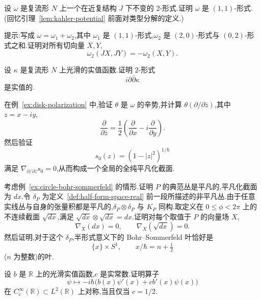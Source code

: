 {\begin{exercise}[辛形式的类型分解]\label{ex:symplectic-form-type-one-one}
设 $\omega$ 是复流形 $N$ 上一个在近复结构 $J$ 下不变的 2-形式.证明 $\omega$ 是 $(1,1)$-形式.(回忆引理~\ref{lem:kahler-potential} 前面对类型分解的定义.)

提示:写成 $\omega=\omega_1+\omega_2$,其中 $\omega_1$ 是 $(1,1)$-形式,$\omega_2$ 是 $(2,0)$-形式与 $(0,2)$-形式之和.证明对所有切向量 $X,Y$,
\[
 \omega_2(JX,JY)=-\omega_2(X,Y).
\]
\end{exercise}

\begin{exercise}\label{ex:kahler-potential-reality}
设 $\kappa$ 是复流形 $N$ 上光滑的实值函数.证明 2-形式
\[
 i\partial\bar\partial\kappa
\]
是实值的.
\end{exercise}

\begin{exercise}[圆盘例子的局部计算]\label{ex:disk-polarization-calculation}
在例~\ref{ex:disk-polarization} 中,验证 $\theta$ 是 $\omega$ 的辛势,并计算 $\theta(\partial/\partial\bar z)$,其中 $z=x-iy$,
\[
 \frac{\partial}{\partial\bar z}=\frac12\left(\frac{\partial}{\partial x}-i\frac{\partial}{\partial y}\right).
\]
然后验证
\[
 s_0(z)=(1-|z|^2)^{1/\hbar}
\]
满足 $\nabla_{\partial/\partial\bar z}s_0=0$,从而构成一个全局的全纯平凡化截面.
\end{exercise}

\begin{exercise}\label{ex:half-form-bohr-sommerfeld-circle}
考虑例~\ref{ex:circle-bohr-sommerfeld} 的情形.证明 $P$ 的典范丛是平凡的,平凡化截面为 $dx$.令 $\delta_P$ 为定义~\ref{def:half-form-space-real} 前一段所描述的非平凡丛.由于任意实线丛与自身的张量积都是平凡的,$\delta_P\otimes\delta_P$ 与 $K_P$ 同构.取定义在 $0\le\phi<2\pi$ 上的不连续截面 $\sqrt{dx}$,满足 $\sqrt{dx}\otimes\sqrt{dx}=dx$.证明对每个取值于 $P$ 的向量场 $X$,
\[
 \nabla_X(dx)=0,\qquad \nabla_X(\sqrt{dx})=0.
\]
然后证明,对于这个 $\delta_P$,半形式意义下的 Bohr--Sommerfeld 叶恰好是
\[
 \{x\}\times S^1,\qquad x/\hbar=n+\tfrac12
\]
($n$ 为整数)的叶.
\end{exercise}

\begin{exercise}[半形式系数的唯一性]\label{ex:symmetric-half-form-coefficient}
设 $b$ 是 $\mathbb R$ 上的光滑实值函数,$c$ 是实常数.证明算子
\[
 \psi\longmapsto-i\hbar\bigl(b(x)\psi'(x)+cb'(x)\psi(x)\bigr)
\]
在 $C_c^\infty(\mathbb R)\subset L^2(\mathbb R)$ 上对称,当且仅当 $c=1/2$.
\end{exercise}

}
